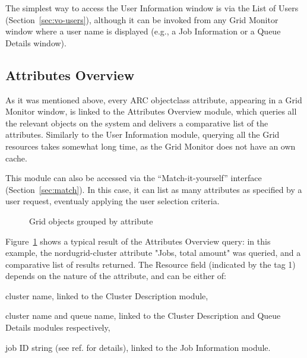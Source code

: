 \documentclass{article}
\begin{document}
The simplest way to access the User Information window is via the List
of Users (Section~\ref{sec:vo-users}), although it can be invoked from
any Grid Monitor window where a user name is displayed (e.g., a Job
Information or a Queue Details window).

\subsection{Attributes Overview}
\label{sec:attlist}

As it was mentioned above, every ARC objectclass attribute,
 appearing in a Grid Monitor window, is linked to
the Attributes Overview module, which queries all the relevant objects
on the system and delivers a comparative list of the
attributes. Similarly to the User Information module, querying all the
Grid resources takes somewhat long time, as the Grid Monitor does
not have an own cache.

This module can also be accessed via the ``Match-it-yourself''
interface (Section~\ref{sec:match}). In this case, it can list as many
attributes as specified by a user request, eventualy applying the user
selection criteria.

\begin{figure}[hb]
  \caption{\label{fig:attlist}Grid objects grouped by attribute}
\end{figure}

Figure~\ref{fig:attlist} shows a typical result of the Attributes
Overview query: in this example, the \textsf{nordugrid-cluster}
attribute "Jobs, total amount" was queried, and a comparative list of
results returned. The \textsf{Resource} field (indicated by the tag 1)
depends on the nature of the attribute, and can be either of:
\begin{list}{--}{\itemsep=-0.5mm}
\item cluster name, linked to the Cluster Description module,
\item cluster name and queue name, linked to the Cluster Description
  and Queue Details modules respectively,
\item job ID string (see ref.\cite{gm} for details), linked to the Job
  Information module.
\end{list}
\end{document}
